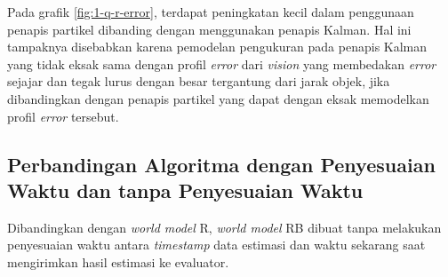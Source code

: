 Pada grafik \ref{fig:1-q-r-error}, terdapat peningkatan kecil dalam penggunaan penapis partikel dibanding dengan menggunakan penapis Kalman. Hal ini tampaknya disebabkan karena pemodelan pengukuran pada penapis Kalman yang tidak eksak sama dengan profil \textit{error} dari \textit{vision} yang membedakan \textit{error} sejajar dan tegak lurus dengan besar tergantung dari jarak objek, jika dibandingkan dengan penapis partikel yang dapat dengan eksak memodelkan profil \textit{error} tersebut.

\subsection{Perbandingan Algoritma dengan Penyesuaian Waktu dan tanpa Penyesuaian Waktu}

Dibandingkan dengan \textit{world model} R, \textit{world model} RB dibuat tanpa melakukan penyesuaian waktu antara \textit{timestamp} data estimasi dan waktu sekarang saat mengirimkan hasil estimasi ke evaluator.

